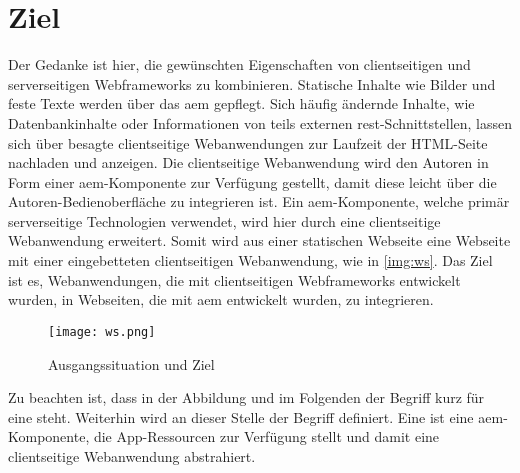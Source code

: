 \section{Ziel}
Der Gedanke ist hier, die gewünschten Eigenschaften von clientseitigen und serverseitigen Webframeworks zu kombinieren. Statische Inhalte wie Bilder und feste Texte werden über das \ac{aem} gepflegt. Sich häufig ändernde Inhalte, wie Datenbankinhalte oder Informationen von teils externen \ac{rest}-Schnittstellen, lassen sich über besagte clientseitige Webanwendungen zur Laufzeit der HTML-Seite nachladen und anzeigen. Die clientseitige Webanwendung wird den Autoren in Form einer \ac{aem}-Komponente zur Verfügung gestellt, damit diese leicht über die Autoren-Bedienoberfläche zu integrieren ist. Ein \ac{aem}-Komponente, welche primär serverseitige Technologien verwendet, wird hier durch eine clientseitige Webanwendung erweitert. Somit wird aus einer statischen Webseite eine Webseite mit einer eingebetteten clientseitigen Webanwendung, wie in \autoref{img:ws}. Das Ziel ist es, Webanwendungen, die mit clientseitigen Webframeworks entwickelt wurden, in Webseiten, die mit \ac{aem} entwickelt wurden, zu integrieren.\\

\begin{figure}[H]
	\begin{center}
		\texttt{[image: ws.png]}
		\caption{Ausgangssituation und Ziel}
		\label{img:ws}
	\end{center}
\end{figure}

Zu beachten ist, dass in der Abbildung und im Folgenden der Begriff  kurz für eine  steht. 
Weiterhin wird an dieser Stelle der Begriff \ajc{} definiert. Eine \ajc ist eine \ac{aem}-Komponente, die App-Ressourcen zur Verfügung stellt und damit eine clientseitige Webanwendung abstrahiert.

